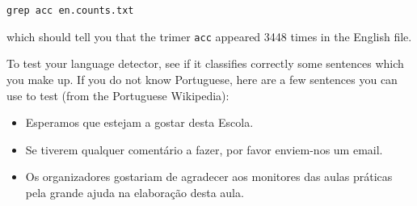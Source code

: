 \begin{verbatim}
grep acc en.counts.txt
\end{verbatim}

which should tell you that the trimer \texttt{acc} appeared 3448 times in the English file.

To test your language detector, see if it classifies correctly some sentences which you make up. If you do not know Portuguese, here are a few sentences you can use to test (from the Portuguese Wikipedia):

\begin{itemize}
\item Esperamos que estejam a gostar desta Escola.
\item Se tiverem qualquer coment\'{a}rio a fazer, por favor enviem-nos um email.
\item Os organizadores gostariam de agradecer aos monitores das aulas pr\'{a}ticas pela grande ajuda na elabora\c{c}\~{a}o desta aula.
\end{itemize}

%
%
%
%
%
%
%

